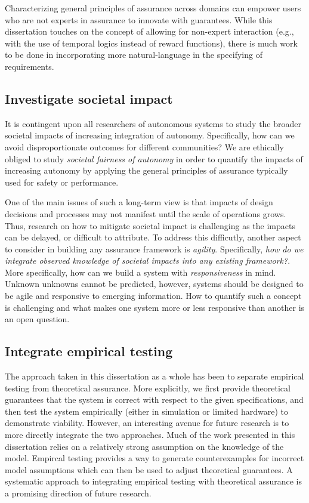 Characterizing general principles of assurance across domains can empower users who are not experts in assurance to innovate with guarantees. While this dissertation touches on the concept of allowing for non-expert interaction (e.g., with the use of temporal logics instead of reward functions), there is much work to be done in incorporating more natural-language in the specifying of requirements. 

\subsection{Investigate societal impact}
It is contingent upon all researchers of autonomous systems to study the broader societal impacts of increasing integration of autonomy. Specifically, how can we avoid disproportionate outcomes for different communities? We are ethically obliged to study \emph{societal fairness of autonomy} in order to quantify the impacts of increasing autonomy by applying the general principles of assurance typically used for safety or performance. %

One of the main issues of such a long-term view is that impacts of design decisions and processes may not manifest until the scale of operations grows. Thus, research on how to mitigate societal impact is challenging as the impacts can be delayed, or difficult to attribute. To address this difficutly, another aspect to consider in building any assurance framework is \emph{agility}. Specifically, \emph{how do we integrate observed knowledge of societal impacts into any existing framework?}. More specifically, how can we build a system with \emph{responsiveness} in mind. Unknown unknowns cannot be predicted, however, systems should be designed to be agile and responsive to emerging information. How to quantify such a concept is challenging and what makes one system more or less responsive than another is an open question.   

\subsection{Integrate empirical testing}
The approach taken in this dissertation as a whole has been to separate empirical testing from theoretical assurance. More explicitly, we first provide theoretical guarantees that the system is correct with respect to the given specifications, and then test the system empirically (either in simulation or limited hardware) to demonstrate viability. However, an interesting avenue for future research is to more directly integrate the two approaches. Much of the work presented in this dissertation relies on a relatively strong assumption on the knowledge of the model. Empircal testing provides a way to generate counterexamples for incorrect model assumptions which can then be used to adjust theoretical guarantees. A systematic approach to integrating empirical testing with theoretical assurance is a promising direction of future research. 


